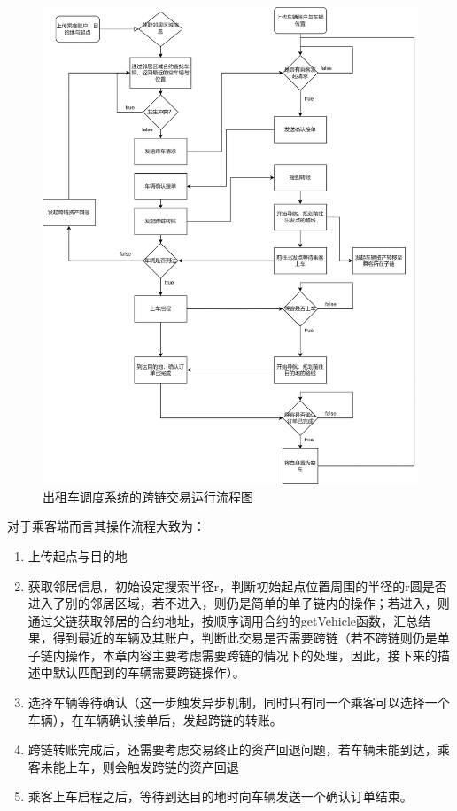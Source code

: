 \begin{figure}
	\centering
	\includegraphics[width=\textwidth]{figures/出租车调度系统的跨链交易运行流程图.png}
	\caption{出租车调度系统的跨链交易运行流程图}
	\label{fig:出租车调度系统的跨链交易运行流程图}
\end{figure}

对于乘客端而言其操作流程大致为：

\begin{enumerate}
    \item 上传起点与目的地
    \item 获取邻居信息，初始设定搜索半径r，判断初始起点位置周围的半径的r圆是否进入了别的邻居区域，若不进入，则仍是简单的单子链内的操作；若进入，则通过父链获取邻居的合约地址，按顺序调用合约的getVehicle函数，汇总结果，得到最近的车辆及其账户，判断此交易是否需要跨链（若不跨链则仍是单子链内操作，本章内容主要考虑需要跨链的情况下的处理，因此，接下来的描述中默认匹配到的车辆需要跨链操作）。
    \item 选择车辆等待确认（这一步触发异步机制，同时只有同一个乘客可以选择一个车辆），在车辆确认接单后，发起跨链的转账。
    \item 跨链转账完成后，还需要考虑交易终止的资产回退问题，若车辆未能到达，乘客未能上车，则会触发跨链的资产回退
    \item 乘客上车启程之后，等待到达目的地时向车辆发送一个确认订单结束。
\end{enumerate}


